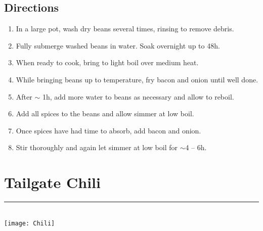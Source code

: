 \documentclass[12pt]{article}
\def \hzline{\noindent \rule[0mm]{\textwidth}{1pt}}
\begin{document}
\subsection*{Directions}
\begin{enumerate}
  \item In a large pot, wash dry beans several times, rinsing to remove debris.
  \item Fully submerge washed beans in water. Soak overnight up to 48h. 
  \item When ready to cook, bring to light boil over medium heat. 
  \item While bringing beans up to temperature, fry bacon and onion until well done. 
  \item After $\sim$ 1h, add more water to beans as necessary and allow to reboil. 
  \item Add all spices to the beans and allow simmer at low boil. 
  \item Once spices have had time to absorb, add bacon and onion. 
  \item Stir thoroughly and again let simmer at low boil for $\sim$4 -- 6h.
\end{enumerate}


\newpage
\section*{Tailgate Chili} \hzline \\

\hfill \texttt{[image: Chili]} %
\end{document}
